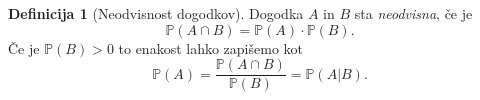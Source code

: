 \documentclass[11pt]{article}
\theoremstyle{definition}
\newtheorem{definicija}{Definicija}[section]
\theoremstyle{definition}
\theoremstyle{definition}
\begin{document}
\begin{definicija}[Neodvisnost dogodkov]

Dogodka $A$ in $B$ sta \textit{neodvisna}, če je 
$$\mathbb{P}(A \cap B) = \mathbb{P}(A) \cdot \mathbb{P}(B).$$
Če je $\mathbb{P}(B) > 0$ to enakost lahko zapišemo kot
$$\mathbb{P}(A) = \frac{\mathbb{P}(A \cap B)}{\mathbb{P}(B)} = \mathbb{P}(A | B).$$

\end{definicija}
\vspace{0.5cm}
\end{document}
